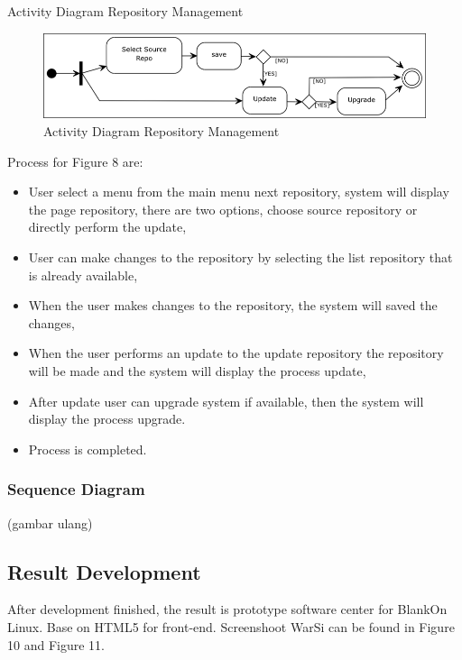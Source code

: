 \documentclass[conference, letterpaper]{IEEEtran}
\begin{document}
Activity Diagram Repository Management

\begin{figure}[!t]
\centering
\includegraphics[scale=0.5]{image/ADManagement.png}
\caption{Activity Diagram Repository Management}
\end{figure}

Process for Figure 8 are:
\begin{itemize}
\item User select a menu from the main menu next repository, system will display the page repository, there are two options, choose source repository or directly perform the update,
\item User can make changes to the repository by selecting the list
repository that is already available,
\item When the user makes changes to the repository, the system will saved the changes,
\item When the user performs an update to the update repository the repository will be made and the system will display the process update,
\item After update user can upgrade system if available, then the system will display the process upgrade.
\item Process is completed.
\end{itemize}

\subsubsection{Sequence Diagram}
(gambar ulang)

\subsection{Result Development}
After development finished, the result is prototype software center for BlankOn Linux. Base on HTML5 for front-end. Screenshoot WarSi can be found in Figure 10 and Figure 11.
\end{document}
